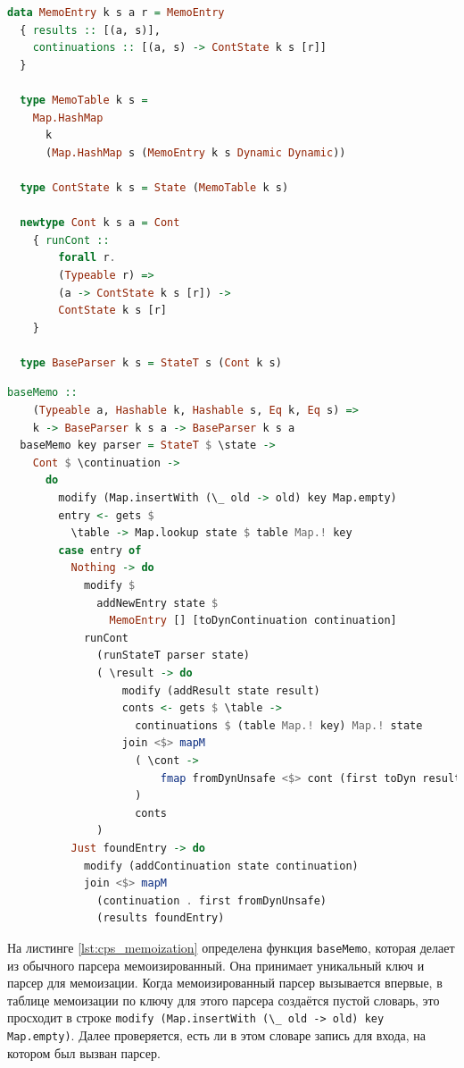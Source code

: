 \documentclass[times]{itmo-student-thesis}
\begin{document}
\begin{lstlisting}[language=Haskell,float=!h,caption={Типы для CPS-парсера},label={lst:cps_types}]
  data MemoEntry k s a r = MemoEntry
  { results :: [(a, s)],
    continuations :: [(a, s) -> ContState k s [r]]
  }

  type MemoTable k s =
    Map.HashMap
      k
      (Map.HashMap s (MemoEntry k s Dynamic Dynamic))

  type ContState k s = State (MemoTable k s)

  newtype Cont k s a = Cont
    { runCont ::
        forall r.
        (Typeable r) =>
        (a -> ContState k s [r]) ->
        ContState k s [r]
    }

  type BaseParser k s = StateT s (Cont k s)
\end{lstlisting}

\begin{lstlisting}[language=Haskell,float=!h,caption={Мемоизация для CPS-парсера},label={lst:cps_memoization}]
  baseMemo ::
    (Typeable a, Hashable k, Hashable s, Eq k, Eq s) =>
    k -> BaseParser k s a -> BaseParser k s a
  baseMemo key parser = StateT $ \state ->
    Cont $ \continuation ->
      do
        modify (Map.insertWith (\_ old -> old) key Map.empty)
        entry <- gets $
          \table -> Map.lookup state $ table Map.! key
        case entry of
          Nothing -> do
            modify $
              addNewEntry state $
                MemoEntry [] [toDynContinuation continuation]
            runCont
              (runStateT parser state)
              ( \result -> do
                  modify (addResult state result)
                  conts <- gets $ \table ->
                    continuations $ (table Map.! key) Map.! state
                  join <$> mapM
                    ( \cont ->
                        fmap fromDynUnsafe <$> cont (first toDyn result)
                    )
                    conts
              )
          Just foundEntry -> do
            modify (addContinuation state continuation)
            join <$> mapM
              (continuation . first fromDynUnsafe)
              (results foundEntry)
\end{lstlisting}

На листинге \ref{lst:cps_memoization} определена функция \lstinline{baseMemo}, которая делает из обычного парсера
мемоизированный. Она принимает уникальный ключ и парсер  для мемоизации. Когда мемоизированный парсер вызывается
впервые, в таблице мемоизации по ключу для этого парсера создаётся пустой словарь, это просходит в строке
\lstinline{modify (Map.insertWith (\_ old -> old) key Map.empty)}. Далее проверяется, есть ли в этом словаре запись для 
входа, на котором был вызван парсер.
\end{document}
